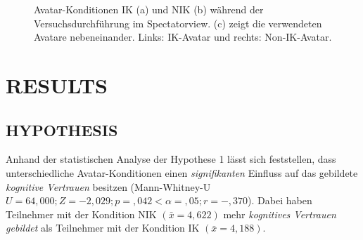 \documentclass[sigchi]{acmart}
\begin{document}
\begin{figure}[h]
  \centering
  \qquad
  \qquad
  \caption[Die Avatare und der Spectatorview]{Avatar-Konditionen IK (a) und NIK (b) während der Versuchsdurchführung im Spectatorview. (c) zeigt die verwendeten Avatare nebeneinander. Links: IK-Avatar und rechts: Non-IK-Avatar.}
  \label{AvatareImEinsatz}
\end{figure}

\section{RESULTS}
\subsection{HYPOTHESIS}
Anhand der statistischen Analyse der Hypothese 1 lässt sich feststellen, dass unterschiedliche Avatar-Konditionen einen \textit{signifikanten} Einfluss auf das gebildete \textit{kognitive Vertrauen} besitzen (Mann-Whitney-U $U = 64,000; Z = -2,029; p =,042 < \alpha =,05; r =-,370$). Dabei haben Teilnehmer mit der Kondition NIK $(\bar{x} = 4,622)$ mehr \textit{kognitives Vertrauen gebildet} als Teilnehmer mit der Kondition IK $(\bar{x} = 4,188)$. 
\end{document}
